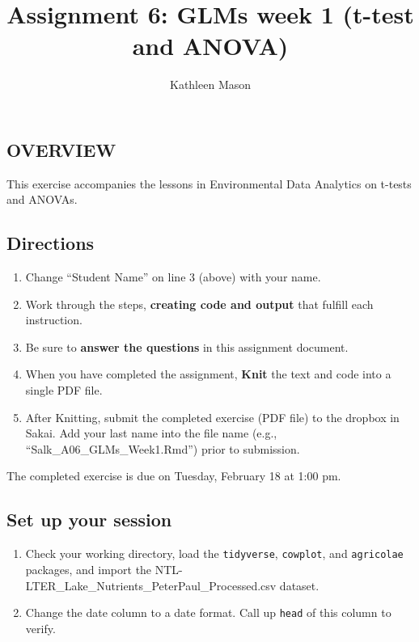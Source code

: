 \documentclass[]{article}
\title{Assignment 6: GLMs week 1 (t-test and ANOVA)}
\author{Kathleen Mason}
\date{}
\providecommand{\tightlist}{%
  \setlength{\itemsep}{0pt}\setlength{\parskip}{0pt}}
\begin{document}
\maketitle

\hypertarget{overview}{%
\subsection{OVERVIEW}\label{overview}}

This exercise accompanies the lessons in Environmental Data Analytics on
t-tests and ANOVAs.

\hypertarget{directions}{%
\subsection{Directions}\label{directions}}

\begin{enumerate}
\def\labelenumi{\arabic{enumi}.}
\tightlist
\item
  Change ``Student Name'' on line 3 (above) with your name.
\item
  Work through the steps, \textbf{creating code and output} that fulfill
  each instruction.
\item
  Be sure to \textbf{answer the questions} in this assignment document.
\item
  When you have completed the assignment, \textbf{Knit} the text and
  code into a single PDF file.
\item
  After Knitting, submit the completed exercise (PDF file) to the
  dropbox in Sakai. Add your last name into the file name (e.g.,
  ``Salk\_A06\_GLMs\_Week1.Rmd'') prior to submission.
\end{enumerate}

The completed exercise is due on Tuesday, February 18 at 1:00 pm.

\hypertarget{set-up-your-session}{%
\subsection{Set up your session}\label{set-up-your-session}}

\begin{enumerate}
\def\labelenumi{\arabic{enumi}.}
\item
  Check your working directory, load the \texttt{tidyverse},
  \texttt{cowplot}, and \texttt{agricolae} packages, and import the
  NTL-LTER\_Lake\_Nutrients\_PeterPaul\_Processed.csv dataset.
\item
  Change the date column to a date format. Call up \texttt{head} of this
  column to verify.
\end{enumerate}
\end{document}
